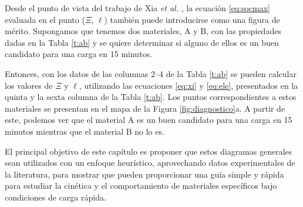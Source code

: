 Desde el punto de vista del trabajo de Xia \textit{et al.} \cite{xia2022}, 
la ecuación \ref{eq:socmax} evaluada en el punto ($\Xi$, $\ell$) también puede 
introducirse como una figura de mérito. Supongamos que 
tenemos dos materiales, A y B, con las propiedades dadas en la Tabla \ref{t:ab} y 
se quiere determinar si alguno de ellos es un buen candidato para una carga en 15 
minutos.
\begin{table}[h!]
    \centering
    \caption{Ejemplo de dos materiales, A y B, caracterizados por sus coeficientes 
    de difusión, sus constantes cinéticas y sus tamaños.}
    \setlength\extrarowheight{2pt}
    \label{t:ab}
\end{table}
Entonces, con los datos de las columnas 2--4 de la Tabla \ref{t:ab} 
se pueden calcular los valores de $\Xi$ y $\ell$, utilizando las ecuaciones 
\ref{eq:xi} y \ref{eq:ele}, presentados en la quinta y la sexta columna de la 
Tabla \ref{t:ab}. Los puntos correspondientes a estos materiales se presentan en 
el mapa de la Figura \ref{fig:diagnostico}a. A partir de este, podemos ver que el 
material A es un buen candidato para una carga en 15 minutos mientras que el 
material B no lo es.

El principal objetivo de este capítulo es proponer que estos diagramas generales 
sean utilizados con un enfoque heurístico, aprovechando datos experimentales de la
literatura, para mostrar que pueden proporcionar una guía simple y rápida para 
estudiar la cinética y el comportamiento de materiales específicos bajo 
condiciones de carga rápida.
